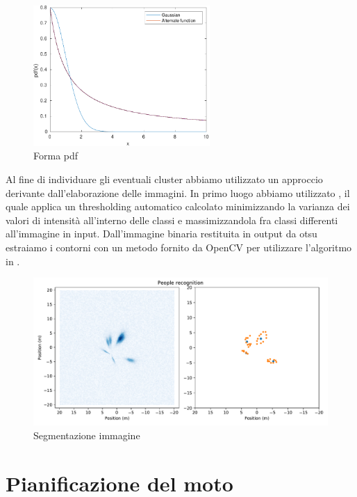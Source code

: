 \documentclass[a4paper]{article}
\begin{document}
	\begin{figure}[H]
		\centering
		\includegraphics[width=0.6\textwidth]{./img/pdf_shape.pdf}
		\caption{Forma pdf}
		\label{fig:pdf_shape}
	\end{figure}

	Al fine di individuare gli eventuali cluster abbiamo utilizzato un approccio derivante dall'elaborazione delle immagini.
	In primo luogo abbiamo utilizzato \cite{otsu}, il quale applica un thresholding automatico calcolato minimizzando la varianza dei valori di intensità all'interno delle classi e massimizzandola fra classi differenti all'immagine in input.
	Dall'immagine binaria restituita in output da otsu estraiamo i contorni con un metodo fornito da OpenCV per utilizzare l'algoritmo in \cite{contours}.

	\begin{figure}[H]
		\centering
		\includegraphics[width=1\textwidth]{./img/image_segmentation.pdf}
		\caption{Segmentazione immagine}
		\label{fig:image_segmentation}
	\end{figure}
		
	\section{Pianificazione del moto}\label{sec:Pianificazione-del-moto}
	
\end{document}
